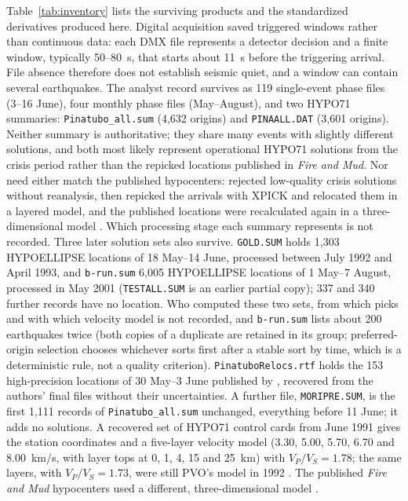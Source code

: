 \documentclass[linenum]{SSA-SRL}
\newcommand{\file}[1]{\texttt{#1}}
\begin{document}
Table~\ref{tab:inventory} lists the surviving products and the standardized derivatives produced here. Digital acquisition saved triggered windows rather than continuous data: each DMX file represents a detector decision and a finite window, typically 50--80~s, that starts about 11~s before the triggering arrival. File absence therefore does not establish seismic quiet, and a window can contain several earthquakes. The analyst record survives as 119 single-event phase files (3--16 June), four monthly phase files (May--August), and two HYPO71 summaries: \file{Pinatubo\_all.sum} (4,632 origins) and \file{PINAALL.DAT} (3,601 origins). Neither summary is authoritative; they share many events with slightly different solutions, and both most likely represent operational HYPO71 solutions from the crisis period rather than the repicked locations published in \textit{Fire and Mud}. Nor need either match the published hypocenters: \citet{Harlow_1996} rejected low-quality crisis solutions without reanalysis, then repicked the arrivals with XPICK and relocated them in a layered model, and the published locations were recalculated again in a three-dimensional model \citep{Mori_1996b}. Which processing stage each summary represents is not recorded. Three later solution sets also survive. \file{GOLD.SUM} holds 1,303 HYPOELLIPSE locations of 18 May--14 June, processed between July 1992 and April 1993, and \file{b-run.sum} 6,005 HYPOELLIPSE locations of 1 May--7 August, processed in May 2001 (\file{TESTALL.SUM} is an earlier partial copy); 337 and 340 further records have no location. Who computed these two sets, from which picks and with which velocity model is not recorded, and \file{b-run.sum} lists about 200 earthquakes twice (both copies of a duplicate are retained in its group; preferred-origin selection chooses whichever sorts first after a stable sort by time, which is a deterministic rule, not a quality criterion). \file{PinatuboRelocs.rtf} holds the 153 high-precision locations of 30 May--3 June published by \citet{Jones_2001}, recovered from the authors' final files without their uncertainties. A further file, \file{MORIPRE.SUM}, is the first 1,111 records of \file{Pinatubo\_all.sum} unchanged, everything before 11 June; it adds no solutions. A recovered set of HYPO71 control cards from June 1991 gives the station coordinates and a five-layer velocity model (3.30, 5.00, 5.70, 6.70 and 8.00~km/s, with layer tops at 0, 1, 4, 15 and 25~km) with $V_P/V_S = 1.78$; the same layers, with $V_P/V_S = 1.73$, were still PVO's model in 1992 \citep{Ramos_1999}. The published \textit{Fire and Mud} hypocenters used a different, three-dimensional model \citep{Mori_1996b}.
\end{document}

